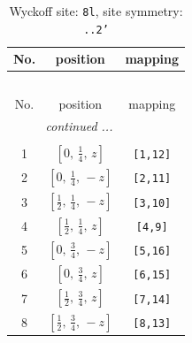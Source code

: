 \documentclass[fleqn,8pt]{jsarticle}
\begin{document}
\begin{longtable}{ccc}
\caption{Wyckoff site: {\tt 8l}, site symmetry: {\tt ..2'}}
 \\
 \hline \hline
No. & position & mapping \\ \hline \endfirsthead

\multicolumn{2}{l}{\tablename\ \thetable{}} \\
 \hline \hline
No. & position & mapping \\ \hline \endhead

 \hline \hline
\multicolumn{2}{r}{\footnotesize\it continued ...} \\ \endfoot

 \hline \hline
\multicolumn{2}{r}{} \\ \endlastfoot

1 & $\left[ 0,\, \frac{1}{4},\, z \right]$ & {\tt [1,12]} \\ \hline
2 & $\left[ 0,\, \frac{1}{4},\, - z \right]$ & {\tt [2,11]} \\ \hline
3 & $\left[ \frac{1}{2},\, \frac{1}{4},\, - z \right]$ & {\tt [3,10]} \\ \hline
4 & $\left[ \frac{1}{2},\, \frac{1}{4},\, z \right]$ & {\tt [4,9]} \\ \hline
5 & $\left[ 0,\, \frac{3}{4},\, - z \right]$ & {\tt [5,16]} \\ \hline
6 & $\left[ 0,\, \frac{3}{4},\, z \right]$ & {\tt [6,15]} \\ \hline
7 & $\left[ \frac{1}{2},\, \frac{3}{4},\, z \right]$ & {\tt [7,14]} \\ \hline
8 & $\left[ \frac{1}{2},\, \frac{3}{4},\, - z \right]$ & {\tt [8,13]} \\
\end{longtable}
\renewcommand{\arraystretch}{1.2}
\end{document}
